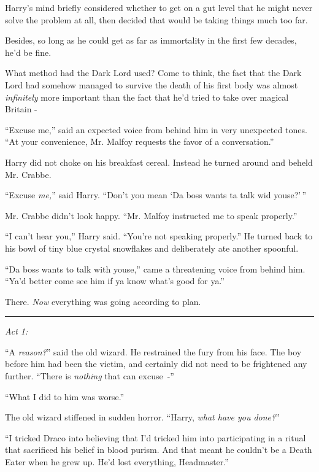 Harry's mind briefly considered whether to get on a gut level that he might never solve the problem at all, then decided that would be taking things much too far.

Besides, so long as he could get as far as immortality in the first few decades, he'd be fine.

What method had the Dark Lord used? Come to think, the fact that the Dark Lord had somehow managed to survive the death of his first body was almost \emph{infinitely} more important than the fact that he'd tried to take over magical Britain -

``Excuse me,'' said an expected voice from behind him in very unexpected tones. ``At your convenience, Mr. Malfoy requests the favor of a conversation.''

Harry did not choke on his breakfast cereal. Instead he turned around and beheld Mr. Crabbe.

``Excuse \emph{me,}'' said Harry. ``Don't you mean `Da boss wants ta talk wid youse?'\,''

Mr. Crabbe didn't look happy. ``Mr. Malfoy instructed me to speak properly.''

``I can't hear you,'' Harry said. ``You're not speaking properly.'' He turned back to his bowl of tiny blue crystal snowflakes and deliberately ate another spoonful.

``Da boss wants to talk with youse,'' came a threatening voice from behind him. ``Ya'd better come see him if ya know what's good for ya.''

There. \emph{Now} everything was going according to plan.

\begin{center}\rule{3in}{0.4pt}\end{center}

\emph{Act 1:}

``A \emph{reason?}'' said the old wizard. He restrained the fury from his face. The boy before him had been the victim, and certainly did not need to be frightened any further. ``There is \emph{nothing} that can excuse~-''

``What I did to him was worse.''

The old wizard stiffened in sudden horror. ``Harry, \emph{what have you done?}''

``I tricked Draco into believing that I'd tricked him into participating in a ritual that sacrificed his belief in blood purism. And that meant he couldn't be a Death Eater when he grew up. He'd lost everything, Headmaster.''

